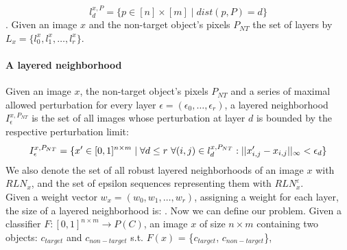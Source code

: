 $$    l_d^{x,P} = \{p \in [n]\times [m] \mid dist(p, P) = d\}$$.
Given an image $x$ and the non-target object's pixels $P_{NT}$ the set of layers by $L_x = \{l_0^x, l_1^x, \ldots, l_r^x\}$.

\paragraph{A layered neighborhood} Given an image $x$, the non-target object's pixels $P_{NT}$ and a series of maximal allowed perturbation for every layer $\epsilon=(\epsilon_0,\ldots,\epsilon_r)$, a layered neighborhood $I^{x,P_{NT}}_\epsilon$ is the set of all images whose perturbation at layer $d$ is bounded by the respective perturbation limit:
$$
    I^{x,P_{NT}}_\epsilon = \{x' \in[0, 1]^{n \times m} \mid \forall d\leq r\ \forall (i,j)\in l_d^{x,P_{NT}}: ||x'_{i,j} -x_{i,j}||_\infty<\epsilon_d\}\\
$$
We also denote the set of all robust layered neighborhoods of an image $x$ with $RLN_x$, and the set of epsilon sequences representing them with $RLN_x^\varepsilon$.\\
Given a weight vector $w_x = (w_0, w_1, \ldots, w_r)$, assigning a weight for each layer, the size of a layered neighborhood is: .
Now we can define our problem.
Given a classifier $F:[0, 1]^{n \times m} \rightarrow P(C)$, an image $x$ of size $n\times m$ containing two objects: $c_{target}$ and $c_{non-target}$ \textrm{s.t.} $F(x)$ = \{$c_{target}$, $c_{non-target}$\},
